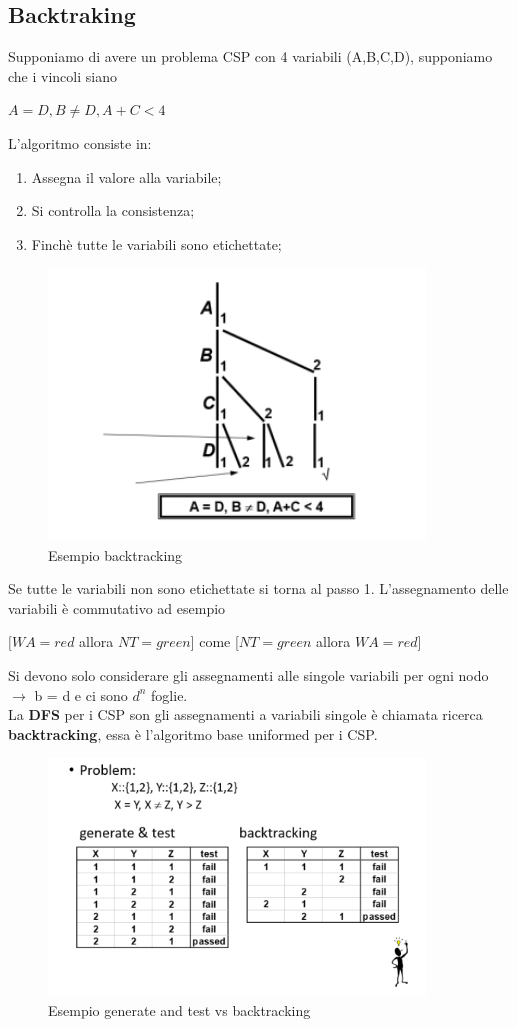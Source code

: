 \subsection{Backtraking}
Supponiamo di avere un problema CSP con 4 variabili (A,B,C,D), supponiamo che i vincoli siano
\begin{center}
    $A = D, B \neq D, A + C < 4$
\end{center}
L’algoritmo consiste in:
\begin{enumerate}
    \item Assegna il valore alla variabile;
    \item Si controlla la consistenza;
    \item Finchè tutte le variabili sono etichettate;
\end{enumerate}
\begin{figure}[htp]
	\centering
    \includegraphics[width=10cm, keepaspectratio]{img/Cap2/back1.png}
    \caption{Esempio backtracking}
\end{figure}
Se tutte le variabili non sono etichettate si torna al passo 1. L’assegnamento delle variabili è commutativo ad esempio
\begin{center}
    $[WA = red$ allora $NT = green]$ come [$NT=green$ allora $WA =red]$
\end{center}
\newpage
Si devono solo considerare gli assegnamenti alle singole variabili per ogni nodo $\rightarrow$ b = d
e ci sono $d^n$ foglie. 
\\La \textbf{DFS} per i CSP son gli assegnamenti a variabili singole è chiamata ricerca \textbf{backtracking}, essa è l’algoritmo base uniformed per i CSP.
\begin{figure}[htp]
	\centering
    \includegraphics[width=10cm, keepaspectratio]{img/Cap2/back2.png}
    \caption{Esempio generate and test vs backtracking}
\end{figure}
